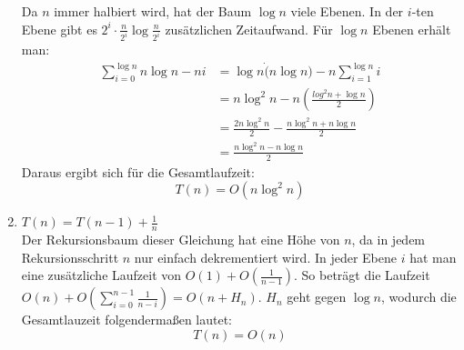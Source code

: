\documentclass[a4paper,10pt]{scrartcl}
\begin{document}
\begin{enumerate}
    Da $n$ immer halbiert wird, hat der Baum $\log n$ viele Ebenen. In der $i$-ten Ebene gibt es $2^{i} \cdot \frac{n}{2^i} \log \frac{n}{2^i}$  zusätzlichen Zeitaufwand.
    Für $\log n$ Ebenen erhält man:
    \begin{align*}
    \sum_{i = 0}^{\log n} n \log n - n i &= \log n \dot (n \log n) - n \sum_{i = 1}^{\log n}i\\
    &= n \log^2 n - n \left(\frac{log^2 n + \log n}{2}\right)\\
    &= \frac{2n \log^2 n}{2} - \frac{n \log^2 n + n \log n}{2}\\
    &= \frac{n \log^2 n - n \log n}{2}
    \end{align*}
    Daraus ergibt sich für die Gesamtlaufzeit:
    \[T(n) = O(n \log^2 n)\]
\item   $T(n) = T(n-1) + \frac{1}{n}$\\
Der Rekursionsbaum dieser Gleichung hat eine Höhe von $n$, da in jedem Rekursionsschritt $n$ nur einfach dekrementiert wird. In jeder Ebene $i$ hat man eine zusätzliche Laufzeit von $O(1) + O\left(\frac{1}{n-1}\right)$. So beträgt die Laufzeit $O(n) + O\left(\sum_{i = 0}^{n-1} \frac{1}{n - i}\right) = O(n + H_n)$. $H_n$ geht gegen $\log n$, wodurch die Gesamtlauzeit folgendermaßen lautet:
    \[T(n) = O(n)\]
\end{enumerate}
\end{document}
